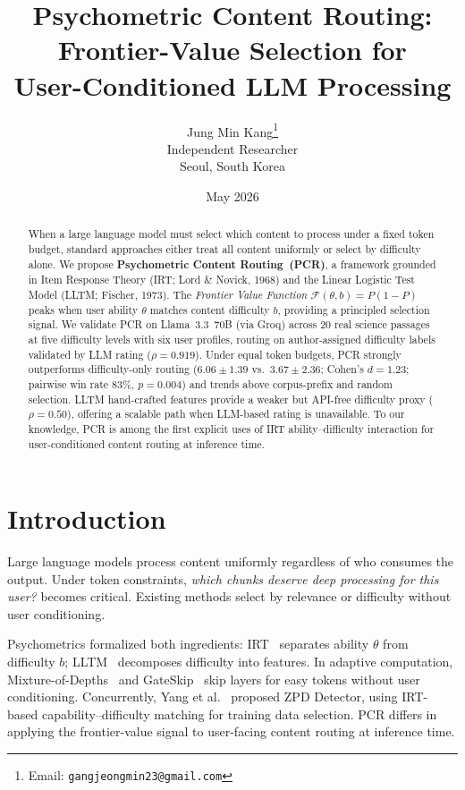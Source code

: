\documentclass[11pt]{article}
\title{\textbf{Psychometric Content Routing:}\\
\Large Frontier-Value Selection for\\User-Conditioned LLM Processing}
\author{Jung Min Kang\thanks{Email: \texttt{gangjeongmin23@gmail.com}}\\
Independent Researcher\\
Seoul, South Korea}
\date{May 2026}
\begin{document}
\maketitle\thispagestyle{fancy}

\begin{abstract}
When a large language model must select which content to process under a fixed token budget, standard approaches either treat all content uniformly or select by difficulty alone.
We propose \textbf{Psychometric Content Routing~(PCR)}, a framework grounded in Item Response Theory (IRT; Lord \& Novick, 1968) and the Linear Logistic Test Model (LLTM; Fischer, 1973).
The \emph{Frontier Value Function} $\mathcal{F}(\theta,b) = P(1{-}P)$ peaks when user ability $\theta$ matches content difficulty $b$, providing a principled selection signal.
We validate PCR on Llama~3.3~70B (via Groq) across 20 real science passages at five difficulty levels with six user profiles, routing on author-assigned difficulty labels validated by LLM rating ($\rho = 0.919$).
Under equal token budgets, PCR strongly outperforms difficulty-only routing ($6.06 \pm 1.39$ vs.\ $3.67 \pm 2.36$; Cohen's $d = 1.23$; pairwise win rate 83\%, $p = 0.004$) and trends above corpus-prefix and random selection.
LLTM hand-crafted features provide a weaker but API-free difficulty proxy ($\rho = 0.50$), offering a scalable path when LLM-based rating is unavailable.
To our knowledge, PCR is among the first explicit uses of IRT ability--difficulty interaction for user-conditioned content routing at inference time.
\end{abstract}

\section{Introduction}

Large language models process content uniformly regardless of who consumes the output.
Under token constraints, \emph{which chunks deserve deep processing for this user?} becomes critical.
Existing methods select by relevance or difficulty without user conditioning.

Psychometrics formalized both ingredients: IRT~\citep{lord1968statistical} separates ability $\theta$ from difficulty $b$; LLTM~\citep{fischer1973lltm} decomposes difficulty into features.
In adaptive computation, Mixture-of-Depths~\citep{raposo2024mod} and GateSkip~\citep{laitenberger2025gateskip} skip layers for easy tokens without user conditioning.
Concurrently, Yang et al.~\citep{yang2026zpd} proposed ZPD Detector, using IRT-based capability--difficulty matching for training data selection.
PCR differs in applying the frontier-value signal to user-facing content routing at inference time.
\end{document}
